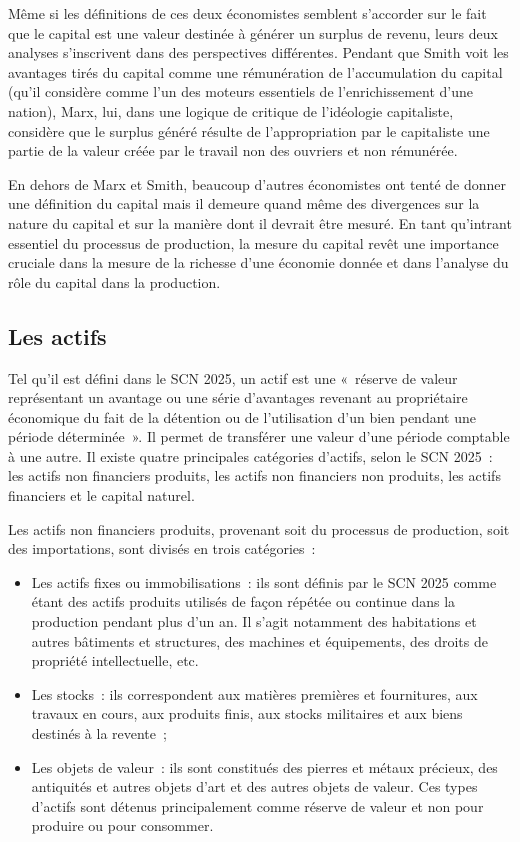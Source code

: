 \documentclass[12pt,a4paper,oneside]{report}
\begin{document}
Même si les définitions de ces deux économistes semblent s’accorder sur le fait que le capital est une valeur
destinée à générer un surplus de revenu, leurs deux analyses s’inscrivent dans des perspectives différentes.
Pendant que Smith voit les avantages tirés du capital comme une rémunération de l’accumulation du capital
(qu’il considère comme l’un des moteurs essentiels de l’enrichissement d’une nation), Marx, lui, dans une
logique de critique de l’idéologie capitaliste, considère que le surplus généré résulte de l’appropriation par
le capitaliste une partie de la valeur créée par le travail non des ouvriers et non rémunérée.

En dehors de Marx et Smith, beaucoup d’autres économistes ont tenté de donner une définition du capital mais
il demeure quand même des divergences sur la nature du capital et sur la manière dont il devrait être mesuré.
En tant qu’intrant essentiel du processus de production, la mesure du capital revêt une importance cruciale
dans la mesure de la richesse d’une économie donnée et dans l’analyse du rôle du capital dans la production.

\subsection{Les actifs}

Tel qu’il est défini dans le SCN 2025, un actif est une «~réserve de valeur représentant un avantage ou une
série d’avantages revenant au propriétaire économique du fait de la détention ou de l’utilisation d’un bien
pendant une période déterminée~». Il permet de transférer une valeur d’une période comptable à une autre. Il
existe quatre principales catégories d’actifs, selon le SCN 2025~: les actifs non financiers produits, les
actifs non financiers non produits, les actifs financiers et le capital naturel.

Les actifs non financiers produits, provenant soit du processus de production, soit des importations, sont
divisés en trois catégories~:

\begin{itemize}

\item Les actifs fixes ou immobilisations~: ils sont définis par le SCN 2025 comme étant des actifs produits
utilisés de façon répétée ou continue dans la production pendant plus d’un an. Il s’agit notamment des
habitations et autres bâtiments et structures, des machines et équipements, des droits de propriété
intellectuelle, etc.

\item Les stocks~: ils correspondent aux matières premières et fournitures, aux travaux en cours, aux produits
finis, aux stocks militaires et aux biens destinés à la revente~;

\item Les objets de valeur~: ils sont constitués des pierres et métaux précieux, des antiquités et autres
objets d’art et des autres objets de valeur. Ces types d’actifs sont détenus principalement comme réserve de
valeur et non pour produire ou pour consommer.

\end{itemize}
\end{document}
